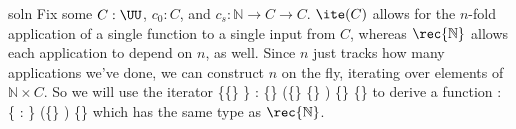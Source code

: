 soln  Fix some $C :
\UU$, $c_{0} : C$, and $c_{s} : \mathbb{N} \to C \to C$.
$\ite(C)$ allows for the $n$-fold application of a single function to a single
input from $C$, whereas $\rec{\mathbb{N}}$ allows each application to
depend on $n$, as well.  Since $n$ just tracks how many applications we've
done, we can construct $n$ on the fly, iterating over elements of $\mathbb{N}
\times C$.  So we will use the iterator
  \{\{\}  \} : \{\}    (\{\}  
   \{\}  )  \{\}  \{\}  
to derive a function
   : \{ : \}   (\{\}    ) 
  \{\}  
which has the same type as $\rec{\mathbb{N}}$.  


